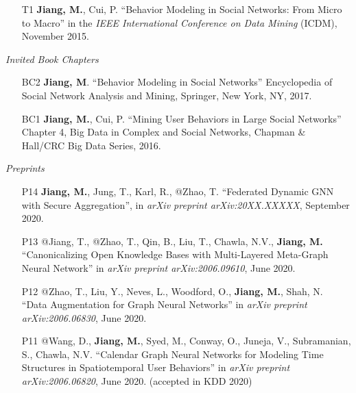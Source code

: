 \documentclass[10pt]{article}
\newenvironment{myindentpar}[1]%
{\begin{list}{}%
         {\setlength{\leftmargin}{#1}}%
         \item[]%
}
{\end{list}}
\newcounter{list}
\begin{document}
\begin{myindentpar}{0.00cm}
\begin{enumerate}[leftmargin=.5cm]
\item[T1] \textbf{Jiang, M.}, Cui, P. ``Behavior Modeling in Social Networks: From Micro to Macro'' in the \textit{IEEE International Conference on Data Mining} (ICDM), November 2015.

\end{enumerate}

\hspace{-0.25cm}\textit{Invited Book Chapters}

\begin{enumerate}[leftmargin=.5cm]

\item[BC2] \textbf{Jiang, M}. ``Behavior Modeling in Social Networks'' Encyclopedia of Social Network Analysis and Mining, Springer, New York, NY, 2017.
		
\item[BC1] \textbf{Jiang, M.}, Cui, P. ``Mining User Behaviors in Large Social Networks'' Chapter 4, Big Data in Complex and Social Networks, Chapman \& Hall/CRC Big Data Series, 2016.

\end{enumerate}

\hspace{-0.25cm}\textit{Preprints}

\begin{enumerate}[leftmargin=.5cm]

\item[P14] \textbf{Jiang, M.}, Jung, T., Karl, R., @Zhao, T. ``Federated Dynamic GNN with Secure Aggregation'', in \textit{arXiv preprint arXiv:20XX.XXXXX}, September 2020.
		
\item[P13] @Jiang, T., @Zhao, T., Qin, B., Liu, T., Chawla, N.V., \textbf{Jiang, M.} ``Canonicalizing Open Knowledge Bases with Multi-Layered Meta-Graph Neural Network'' in \textit{arXiv preprint arXiv:2006.09610}, June 2020.
		
\item[P12] @Zhao, T., Liu, Y., Neves, L., Woodford, O., \textbf{Jiang, M.}, Shah, N. ``Data Augmentation for Graph Neural Networks'' in \textit{arXiv preprint arXiv:2006.06830}, June 2020.

\item[P11] @Wang, D., \textbf{Jiang, M.}, Syed, M., Conway, O., Juneja, V., Subramanian, S., Chawla, N.V. ``Calendar Graph Neural Networks for Modeling Time Structures in Spatiotemporal User Behaviors'' in \textit{arXiv preprint arXiv:2006.06820}, June 2020. (accepted in KDD 2020)
		

\end{enumerate}
\end{myindentpar}
\end{document}
